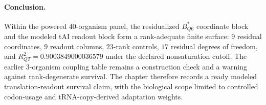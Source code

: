 \paragraph{Conclusion.}
Within the powered $40$-organism panel, the residualized $B^{*}_{Q6}$ coordinate block and the modeled tAI readout block form a rank-adequate finite surface: $9$ residual coordinates, $9$ readout columns, $23$-rank controls, $17$ residual degrees of freedom, and $R^2_{QT}=0.9003849000036579$ under the declared nonsaturation cutoff.  The earlier $3$-organism coupling table remains a construction check and a warning against rank-degenerate survival.  The chapter therefore records a ready modeled translation-readout survival claim, with the biological scope limited to controlled codon-usage and tRNA-copy-derived adaptation weights.

